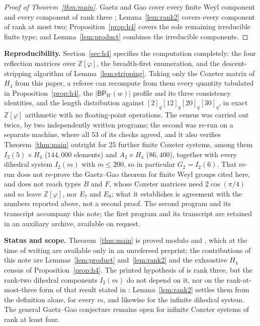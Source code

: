\documentclass[11pt]{amsart}
\newcommand{\BP}{\mathsf{BP}}
\begin{document}
\begin{proof}[Proof of Theorem~\ref{thm:main}]
Gaetz and Gao cover every finite Weyl component
\cite[Theorem~1.2]{GaetzGao} and every component of rank three
\cite[Theorem~3.15]{GaetzGao}; Lemma~\ref{lem:rank2} covers every component
of rank at most two; Proposition~\ref{prop:h4} covers the sole remaining
irreducible finite type; and Lemma~\ref{lem:product} combines the
irreducible components.
\end{proof}

\medskip
\noindent\textbf{Reproducibility.}
Section~\ref{sec:h4} specifies the computation completely: the four
reflection matrices over $\mathbb Z[\varphi]$, the breadth-first
enumeration, and the descent-stripping algorithm of
Lemma~\ref{lem:stripping}. Taking only the Coxeter matrix of $H_4$ from
this paper, a referee can recompute from them every quantity tabulated in
Proposition~\ref{prop:h4}, the $|\BP_W(w)|$ profile and its three
consistency identities, and the length distribution against
$[2]_q[12]_q[20]_q[30]_q$, in exact $\mathbb Z[\varphi]$ arithmetic with no
floating-point operations. The census was carried out twice, by two
independently written programs; the second was re-run on a separate
machine, where all $53$ of its checks agreed, and it also verifies
Theorem~\ref{thm:main} outright for $25$ further finite Coxeter systems,
among them $I_2(5)\times H_4$ ($144{,}000$ elements) and $A_2\times H_4$
($86{,}400$), together with every dihedral system $I_2(m)$ with
$m\leq200$, so in particular $G_2=I_2(6)$. That re-run does not re-prove
the Gaetz--Gao theorem for finite Weyl groups cited here, and does not
reach types $B$ and $F$, whose Coxeter matrices need $2\cos(\pi/4)$
and so leave $\mathbb Z[\varphi]$, nor $E_7$ and $E_8$; what it establishes
is agreement with the numbers reported above, not a second proof. The
second program and its transcript accompany this note; the first program
and its transcript are retained in an auxiliary archive, available on
request.

\medskip
\noindent\textbf{Status and scope.}
Theorem~\ref{thm:main} is proved modulo
\cite[Theorem~1.2]{GaetzGao} and \cite[Theorem~3.15]{GaetzGao}, which at the
time of writing are available only in an unrefereed preprint; the
contributions of this note are Lemmas~\ref{lem:product} and~\ref{lem:rank2}
and the exhaustive $H_4$ census of Proposition~\ref{prop:h4}. The printed
hypothesis of \cite[Theorem~3.15]{GaetzGao} is rank three, but the rank-two
dihedral components $I_2(m)$ do not depend on it, nor on the
rank-at-most-three form of that result stated in
\cite[Section~1]{GaetzGao}: Lemma~\ref{lem:rank2} settles them from the
definition alone, for every $m$, and likewise for the infinite dihedral
system. The general Gaetz--Gao conjecture remains open for infinite Coxeter
systems of rank at least four.
\end{document}
